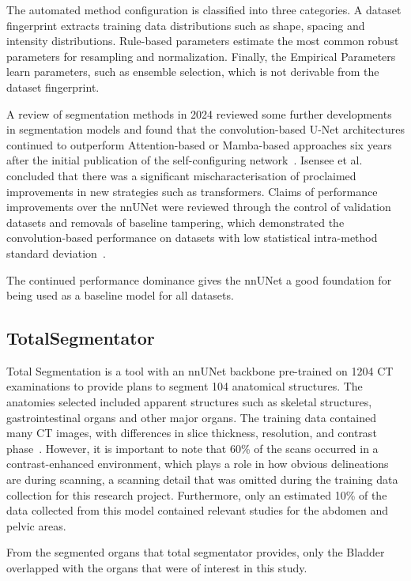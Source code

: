 \documentclass[12pt,twoside]{report}
\begin{document}
The automated method configuration is classified into three categories. A dataset fingerprint extracts training data distributions such as shape, spacing and intensity distributions. Rule-based parameters estimate the most common robust parameters for resampling and normalization. Finally, the Empirical Parameters learn parameters, such as ensemble selection, which is not derivable from the dataset fingerprint.

A review of segmentation methods in 2024 reviewed some further developments in segmentation models and found that the convolution-based U-Net architectures continued to outperform Attention-based or Mamba-based approaches six years after the initial publication of the self-configuring network~\cite{isensee2024nnunet}. Isensee et al. concluded that there was a significant mischaracterisation of proclaimed improvements in new strategies such as transformers. Claims of performance improvements over the nnUNet were reviewed through the control of validation datasets and removals of baseline tampering, which demonstrated the convolution-based performance on datasets with low statistical intra-method standard deviation~\cite{isensee2024nnunet}.

The continued performance dominance gives the nnUNet a good foundation for being used as a baseline model for all datasets.


\subsection{TotalSegmentator}

Total Segmentation is a tool with an nnUNet backbone pre-trained on 1204 CT examinations to provide plans to segment 104 anatomical structures. The anatomies selected included apparent structures such as skeletal structures, gastrointestinal organs and other major organs. The training data contained many CT images, with differences in slice thickness, resolution, and contrast phase~\cite{totalsegmentor-paper}. However, it is important to note that 60\% of the scans occurred in a contrast-enhanced environment, which plays a role in how obvious delineations are during scanning, a scanning detail that was omitted during the training data collection for this research project. Furthermore, only an estimated 10\% of the data collected from this model contained relevant studies for the abdomen and pelvic areas.

From the segmented organs that total segmentator provides, only the Bladder overlapped with the organs that were of interest in this study.
\end{document}
